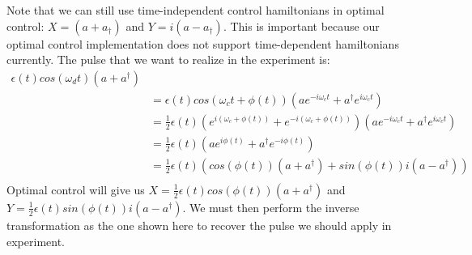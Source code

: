 \documentclass[letterpaper, 12pt]{article}
\begin{document}
Note that we can still use time-independent control hamiltonians in optimal control: $X = (a + a_{\dagger})$ and $Y = i(a - a_{\dagger})$. This is important because our optimal control implementation does not support time-dependent hamiltonians currently. The pulse that we want to realize in the experiment is:
\begin{align*}
  \epsilon(t) cos(\omega_{d}t)(a + a^{\dagger})\\
  &= \epsilon(t) cos(\omega_{c}t + \phi(t))(ae^{-i\omega_{c}t} + a^{\dagger}e^{i\omega_{c}t})\\
  &= \frac{1}{2}\epsilon(t)(e^{i(\omega_{c} + \phi(t))} + e^{-i(\omega_{c} + \phi(t))})(ae^{-i\omega_{c}t} + a^{\dagger}e^{i\omega_{c}t})\\
  &= \frac{1}{2}\epsilon(t)(ae^{i\phi(t)} + a^{\dagger}e^{-i\phi(t)})\\
  &= \frac{1}{2}\epsilon(t)(cos(\phi(t))(a + a^{\dagger}) + sin(\phi(t))i(a - a^{\dagger}))\\
\end{align*}
Optimal control will give us $X = \frac{1}{2}\epsilon(t)cos(\phi(t))(a + a^{\dagger})$ and $Y = \frac{1}{2}\epsilon(t)sin(\phi(t))i(a - a^{\dagger})$. We must then perform the inverse transformation as the one shown here to recover the pulse we should apply in experiment.
\end{document}
